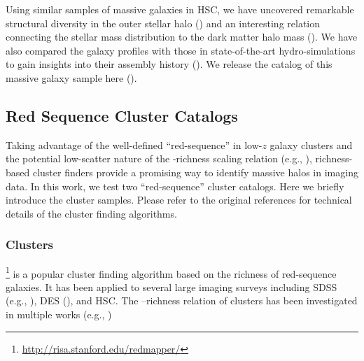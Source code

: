 \documentclass[fleqn,usenatbib,useAMS,english]{mnras}
\begin{document}
    Using similar samples of massive galaxies in HSC, we have uncovered remarkable structural
    diversity in the outer stellar halo (\citealt{Huang2018b}) and an interesting relation
    connecting the stellar mass distribution to the dark matter halo mass (\citealt{Huang2018c,
    Huang2020}).
    We have also compared the galaxy profiles with those in state-of-the-art hydro-simulations to
    gain insights into their assembly history (\citealt{Ardila2021}).
    We release the catalog of this massive galaxy sample here ().

\subsection{Red Sequence Cluster Catalogs}
    \label{sec:cluster_sample}

    Taking advantage of the well-defined ``red-sequence'' in low-$z$ galaxy clusters and
    the potential low-scatter nature of the \mvir{}-richness scaling relation
    (e.g., \citealt{Rozo2009, Rykoff2012}),
    richness-based cluster finders provide a promising way to identify massive halos in
    imaging data.
    In this work, we test two ``red-sequence'' cluster catalogs.
    Here we briefly introduce the cluster samples. Please refer to the original references
    for technical details of the cluster finding algorithms.

\subsubsection{\redm{} Clusters}
    \label{sec:cluster_redmapper}

    \redm{} \citet{Rykoff2014, Rozo2014, Rozo2015a, Rozo2015b}
    \footnote{\url{http://risa.stanford.edu/redmapper/}} is a popular cluster finding algorithm
    based on the richness of red-sequence galaxies.
    It has been applied to several large imaging surveys including SDSS (e.g.,
    \citealt{Rykoff2014}), DES (\citealt{Rykoff2016, McClintock2019}), and HSC.
    The \mvir{}--richness relation of \redm{} clusters has been investigated in multiple
    works (e.g., \citealt{Saro2015, Farahi2016, Simet2017, Melchior2017, Baxter2018, Murata2018,
    McClintock2019})
\end{document}
